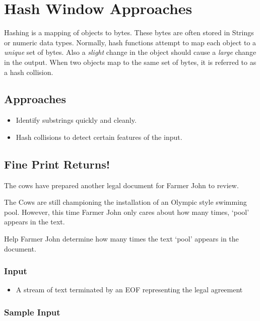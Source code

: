 \section{Hash Window Approaches}
Hashing is a mapping of objects to bytes.
These bytes are often stored in Strings or numeric data types.
Normally, hash functions attempt to map each object to a \textit{unique} set of bytes.
Also a \textit{slight} change in the object should cause a \textit{large} change in the output.
When two objects map to the same set of bytes, it is referred to as a hash collision.

\subsection{Approaches}
\begin{itemize}
	\item Identify substrings quickly and cleanly.
	\item Hash collisions to detect certain features of the input.
\end{itemize}

\subsection{Fine Print Returns!}
The cows have prepared another legal document for Farmer John to review.

The Cows are still championing the installation of an Olympic style swimming pool.
However, this time Farmer John only cares about how many times, `pool' appears in the text.

Help Farmer John determine how many times the text `pool' appears in the document.

\subsubsection{Input}
\begin{itemize}
	\item A stream of text terminated by an EOF representing the legal agreement
\end{itemize}

\subsubsection{Sample Input}

